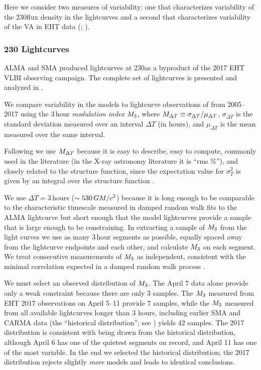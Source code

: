 Here we consider two measures of variability: one that characterizes variability of the 230\GHz flux density in the lightcurves \citep{Wielgus2022} and a second that characterizes variability of the VA in EHT data (; \citealt{NoiseModeling}).

\subsubsection{230 \GHz Lightcurves}

ALMA and SMA produced \sgra lightcurves at 230\GHz as a byproduct of the 2017 EHT VLBI observing campaign.
The complete set of lightcurves is presented and analyzed in \cite{Wielgus2022}.

We compare variability in the models to lightcurve observations of \sgra from 2005--2017 using the 3\,hour {\em modulation index} $M_{3}$, where $M_{\Delta T} \equiv \sigma_{\Delta T}/\mu_{\Delta T}$, $\sigma_{\Delta T}$ is the standard deviation measured over an interval $\Delta T$ (in hours), and $\mu_{\Delta T}$ is the mean measured over the same interval.

Following \citet{2015ApJ...812..103C} we use $M_{\Delta T}$ because it is easy to describe, easy to compute, commonly used in the literature (in the X-ray astronomy literature it is ``rms \%''), and closely related to the structure function, since the expectation value for $\sigma_T^2$ is given by an integral over the structure function \citep[see][]{Lee_2022}.

We use $\Delta T = 3$\,hours ($\sim 530\,GM/c^3$) because it is long enough to be comparable to the characteristic timescale measured in damped random walk fits to the ALMA lightcurve \citep[see Table 10 of][]{Wielgus2022} but short enough that the model lightcurves provide a sample that is large enough to be constraining.
In extracting a sample of $M_{3}$ from the light curves we use as many 3\,hour segments as possible, equally spaced away from the lightcurve endpoints and each other, and calculate $M_{3}$ on each segment.
We treat consecutive measurements of $M_{3}$ as independent, consistent with the minimal correlation expected in a damped random walk process \citep{Lee_2022}.

We must select an observed distribution of $M_{3}$.
The April 7 data alone provide only a weak constraint because there are only 3 samples.
The $M_{3}$ measured from EHT 2017 observations on April 5--11 provide 7 samples, while the $M_{3}$ measured from all available lightcurves longer than 3 hours, including earlier SMA and CARMA data (the ``historical distribution''; see \citealt{Wielgus2022}) yields 42 samples.
The 2017 distribution is consistent with being drawn from the historical distribution, although April 6 has one of the quietest segments on record, and April 11 has one of the most variable.
In the end we selected the historical distribution; the 2017 distribution rejects slightly {\em more} models and leads to identical conclusions.

